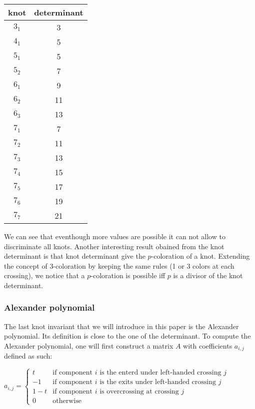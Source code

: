 \documentclass[12pt, a4paper]{article}
\begin{document}
\begin{center}
  \begin{tabular}{| c | c |}
    \hline
    knot & determinant\\
    \hline
    $3_1$ & 3\\
    \hline
    $4_1$ & 5\\
    \hline
    $5_1$ & 5\\
    \hline
    $5_2$ & 7\\
    \hline
    $6_1$ & 9\\
    \hline
    $6_2$ & 11\\
    \hline
    $6_3$ & 13\\
    \hline
    $7_1$ & 7\\
    \hline
    $7_2$ & 11\\
    \hline
    $7_3$ & 13\\
    \hline
    $7_4$ & 15\\
    \hline
    $7_5$ & 17\\
    \hline
    $7_6$ & 19\\
    \hline
    $7_7$ & 21\\
    \hline
  \end{tabular}
\end{center}

We can see that eventhough more values are possible it can not allow to discriminate all knots. Another interesting result obained from the knot determinant is that knot determinant give the $p$-coloration of a knot. Extending the concept of $3$-coloration by keeping the same rules (1 or 3 colors at each crossing), we notice that a $p$-coloration is possible iff $p$ is a divisor of the knot determinant.

\subsubsection{Alexander polynomial}

The last knot invariant that we will introduce in this paper is the Alexander polynomial. Its definition is close to the one of the determinant. To compute the Alexander polynomial, one will first construct a matrix $A$ with coefficients $a_{i,j}$ defined as such: 

\begin{center}
  $a_{i,j} =
  \begin{cases}
    t &\text{if component $i$ is the enterd under left-handed crossing $j$}\\
    -1 &\text{if component $i$ is the exits under left-handed crossing $j$}\\
    1-t &\text{if component $i$ is overcrossing at crossing $j$}\\
    0 &\text{otherwise}
  \end{cases}$
\end{center}
\end{document}
